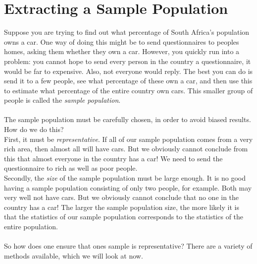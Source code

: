 \section{Extracting a Sample Population}
Suppose you are trying to find out what percentage of South Africa's population owns a car. One way of doing this might be to send questionnaires to peoples homes, asking them whether they own a car. However, you quickly run into a problem: you cannot hope to send every person in the country a questionnaire, it would be far to expensive. Also, not everyone would reply. The best you can do is send it to a few people, see what percentage of these own a car, and then use this to estimate what percentage of the entire country own cars. This smaller group of people is called the \emph{sample population}. \\ \\
The sample population must be carefully chosen, in order to avoid biased results. How do we do this? \\
First, it must be \emph{representative}. If all of our sample population comes from a very rich area, then almost all will have cars. But we obviously cannot conclude from this that almost everyone in the country has a car! We need to send the questionnaire to rich as well as poor people. \\
Secondly, the \emph{size} of the sample population must be large enough. It is no good having a sample population consisting of only two people, for example. Both may very well not have cars. But we obviously cannot conclude that no one in the country has a car! The larger the sample population size, the more likely it is that the statistics of our sample population corresponds to the statistics of the entire population.\\ \\
So how does one ensure that ones sample is representative? There are a variety of methods available, which we will look at now. \\

